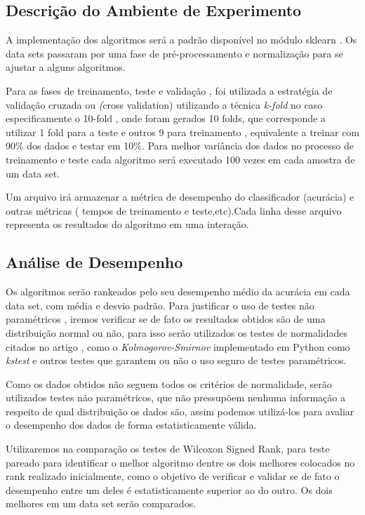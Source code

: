 \documentclass[11pt]{article}
\begin{document}
\subsection{Descrição do Ambiente de Experimento}
 A implementação dos algoritmos será a padrão disponível no módulo sklearn \cite{scikitlearn}. Os data sets passaram por uma fase de pré-processamento e normalização para se ajustar a alguns algoritmos. 
 
 Para as fases de treinamento, teste e validação , foi utilizada a estratégia de validação cruzada ou \emph(cross validation) utilizando a técnica \emph{k-fold} no caso especificamente o 10-fold , onde foram gerados 10 folds, que corresponde a utilizar 1 fold para a teste e outros 9 para treinamento , equivalente a treinar com 90\% dos dados e testar em 10\%. Para melhor variância dos dados no processo de treinamento e teste cada algoritmo será executado 100 vezes em cada amostra de um data set.
 
 Um arquivo irá armazenar a métrica de desempenho do classificador (acurácia) e outras métricas ( tempos de treinamento e teste,etc).Cada linha desse arquivo representa os resultados do algoritmo em uma interação.    
  
\subsection{Análise de Desempenho}

 Os algoritmos serão rankeados pelo seu desempenho médio da acurácia em cada data set, com média e desvio padrão. Para justificar o uso de testes não paramétricos , iremos verificar se de fato os resultados obtidos são de uma distribuição normal ou não, para isso serão utilizados os testes de normalidades citados no artigo \cite{Garciaetal2008} , como o \emph{Kolmogorov-Smirnov} implementado em Python como 
 \emph{kstest} \cite{scipy} e outros testes que garantem ou não o uso seguro de testes paramétricos.
 
 Como os dados obtidos não seguem todos os critérios de normalidade, serão utilizados testes não paramétricos, que não pressupõem nenhuma informação a respeito de qual distribuição os dados são, assim podemos utilizá-los para avaliar o desempenho dos dados de forma estatisticamente válida.
 
 Utilizaremos na comparação os testes de Wilcoxon Signed Rank, para teste pareado para identificar o melhor algoritmo dentre os dois melhores colocados no rank realizado inicialmente, como o objetivo de verificar e validar se de fato o desempenho entre um deles é estatisticamente superior ao do outro. Os dois melhores em um data set serão comparados.
      
\end{document}
